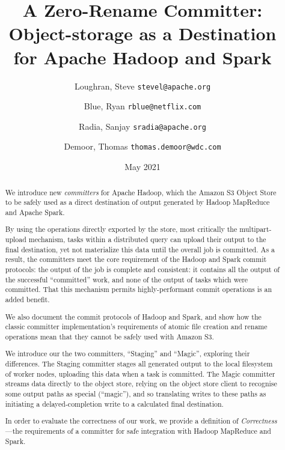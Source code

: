 \documentclass[conference]{IEEEtran}
\title{
    A Zero-Rename Committer:\\
    Object-storage as a Destination\\ for Apache Hadoop and Spark}
\author{
  Loughran, Steve
  \texttt{stevel@apache.org}\\
\and
  Blue, Ryan
  \texttt{rblue@netflix.com}\\
\and
  Radia, Sanjay
  \texttt{sradia@apache.org}
\and
  Demoor, Thomas
  \texttt{thomas.demoor@wdc.com}
}
\date{May 2021}
\begin{document}
\maketitle


\begin{abstract}

We introduce new \emph{committers} for Apache Hadoop, which
the Amazon S3 Object Store to be safely used as a direct destination of output generated
by Hadoop MapReduce and Apache Spark.

By using the operations directly exported by the store,
most critically the multipart-upload mechanism, tasks within a distributed
query can upload their output to the final destination,
yet not materialize this data until the overall job is committed.
As a result, the committers meet the core requirement of the Hadoop and Spark commit
protocols: the output of the job is complete and consistent: it contains
all the output of the successful ``committed'' work, and none of the output of
tasks which were committed.
That this mechanism permits highly-performant commit operations is an added benefit.

We also document the commit protocols of Hadoop and Spark, and show how the classic committer
implementation's requirements of atomic file creation and rename operations mean that they
cannot be safely used with Amazon S3.

We introduce our the two committers, ``Staging'' and ``Magic'', exploring their differences.
The Staging committer stages all generated output to the local filesystem of
worker nodes, uploading this data when a task is committed.
The Magic committer streams data directly to the object store, relying on the
object store client to recognise some output paths as special (``magic''), and
so translating writes to these paths as initiating a delayed-completion write
to a calculated final destination.

In order to evaluate the correctness of our work, we provide a definition
of \emph{Correctness} ---the requirements of a committer for safe integration
with Hadoop MapReduce and Spark.






\end{abstract}
\end{document}

